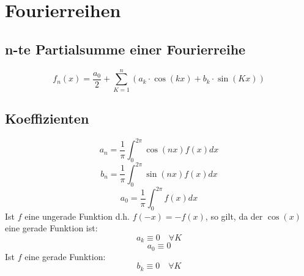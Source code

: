 \section{Fourierreihen}
\subsection{n-te Partialsumme einer Fourierreihe}
\[ \boxed{f_n(x) = \frac{a_0}{2} + \sum_{K=1}^n \left(a_k \cdot \cos(kx) + b_k \cdot \sin(Kx)\right)} \]
\subsection{Koeffizienten}
\[ \boxed{a_n = \frac{1}{\pi} \int_0^{2 \pi} \cos(nx) f(x) dx} \]
\[ \boxed{b_n = \frac{1}{\pi} \int_0^{2 \pi} \sin(nx) f(x) dx} \]
\[ \boxed{a_0 = \frac{1}{\pi} \int_0^{2 \pi} f(x) dx
} \]
Ist $f$ eine ungerade Funktion d.h. $f(-x) = -f(x)$, so gilt, da der $\cos(x)$ eine gerade Funktion ist: 
\[ a_k \equiv 0 \quad \forall K\]
\[ a_0 \equiv 0 \]
Ist $f$ eine gerade Funktion: 
\[ b_k \equiv 0 \quad \forall K \]